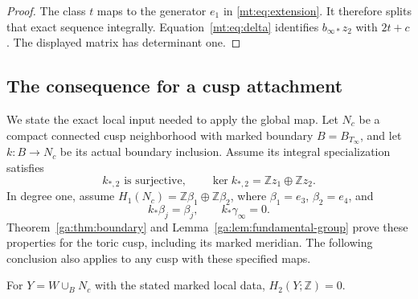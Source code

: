 \begin{proof}
The class $t$ maps to the generator $e_1$ in \eqref{mt:eq:extension}.
It therefore splits that exact sequence integrally.
Equation~\eqref{mt:eq:delta} identifies $b_{\infty*}z_2$ with $2t+c$.
The displayed matrix has determinant one.
\end{proof}

\subsection{The consequence for a cusp attachment}

We state the exact local input needed to apply the global map.
Let $N_c$ be a compact connected cusp neighborhood with marked boundary
$B=B_{T_\infty}$, and let $k:B\to N_c$ be its actual boundary inclusion.
Assume its integral specialization satisfies
\begin{equation}\label{mt:eq:cuspinput}
k_{*,2}\text{ is surjective},\qquad
\ker k_{*,2}=\mathbb Zz_1\oplus\mathbb Zz_2.
\end{equation}
In degree one, assume $H_1(N_c)=\mathbb Z\beta_1\oplus\mathbb Z\beta_2$,
where $\beta_1=e_3$, $\beta_2=e_4$, and
\[
k_*\beta_j=\beta_j,\qquad k_*\gamma_\infty=0.
\]
Theorem~\ref{ga:thm:boundary} and
Lemma~\ref{ga:lem:fundamental-group} prove these properties for
the toric cusp, including its marked meridian. The following
conclusion also applies to any cusp with these specified maps.

\begin{corollary}\label{mt:cor:H2}
For $Y=W\cup_BN_c$ with the stated marked local data,
$H_2(Y;\mathbb Z)=0$.
\end{corollary}

